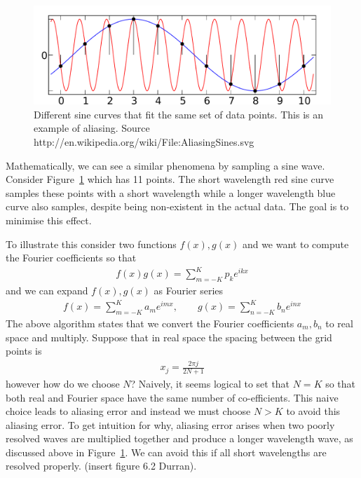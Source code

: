 \begin{figure}
\begin{center}
\includegraphics[width=\textwidth]{aliassine.pdf}
\caption{Different sine curves that fit the same set of data points. This is an example of aliasing. Source http://en.wikipedia.org/wiki/File:AliasingSines.svg}
\end{center}
\label{aliassine}
\end{figure}
Mathematically, we can see a similar phenomena by sampling a sine wave. Consider Figure~\ref{aliassine} which has 11 points. The short wavelength red sine curve samples these points with a short wavelength while a longer wavelength blue curve also samples, despite being non-existent in the actual data. The goal is to minimise this effect. 

To illustrate this consider two functions $f(x),g(x)$ and we want to compute the Fourier coefficients so that
\begin{align}
f(x)g(x) = \sum_{m=-K}^{K} p_{k}e^{ikx}
\end{align}
and we can expand $f(x),g(x)$ as Fourier series
\begin{align}
f(x) = \sum_{m=-K}^{K}a_{m}e^{imx}, \qquad g(x) = \sum_{n=-K}^{K}b_{n}e^{inx}
\end{align}
The above algorithm states that we convert the Fourier coefficients $a_{m},b_{n}$ to real space and multiply. Suppose that in real space the spacing between the grid points is
\begin{align}
x_{j} = \frac{2\pi j}{2N+1}
\end{align}
however how do we choose $N$? Naively, it seems logical to set that $N=K$ so that both real and Fourier space have the same number of co-efficients. This naive choice leads to aliasing error and instead we must choose $N>K$ to avoid this aliasing error. To get intuition for why, aliasing error arises when two poorly resolved waves are multiplied together and produce a longer wavelength wave, as discussed above in Figure~\ref{aliassine}. We can avoid this if all short wavelengths are resolved properly. (insert figure 6.2 Durran).

